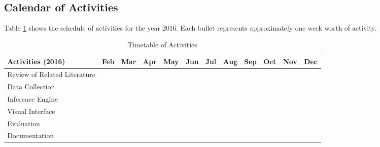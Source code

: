\begin{landscape}
\section{Calendar of Activities}

Table \ref{tab:timetableactivities} shows the schedule of activities for the year 2016.  
Each bullet represents approximately one week worth of activity.

%
%
\newcommand{\weekone}{\textbullet}
\newcommand{\weektwo}{\textbullet \textbullet}
\newcommand{\weekthree}{\textbullet \textbullet \textbullet}
\newcommand{\weekfour}{\textbullet \textbullet \textbullet \textbullet}

%
%
\begin{comment}
   \newcommand{\weekone}{$\star$}
   \newcommand{\weektwo}{$\star \star$}
   \newcommand{\weekthree}{$\star \star \star$}
   \newcommand{\weekfour}{$\star \star \star \star$ }
\end{comment}

\begin{table}[ht]   %
\centering
\caption{Timetable of Activities} \vspace{0.25em}
\begin{tabular}{|p{2in}|c|c|c|c|c|c|c|c|c|c|c|} \hline
\centering Activities (2016) & Feb  & Mar  & Apr  & May  & Jun  & Jul  & Aug  & Sep  & Oct  & Nov  &Dec\\ \hline
Review of Related Literature &  & ~~\weekthree  & \weekfour  & \weekfour  & \weekfour  &  &  &  &  &  &  \\ \hline
Data Collection &  &  & ~~~\weektwo  & \weekfour  & \weekfour  & \weekfour  & \weektwo~~~  &  &  &  &  \\ \hline
Inference Engine &  &  &  &~~~\weektwo  & \weekfour  & \weekfour  & \weekfour  & \weekfour  &  &  & \\ \hline
Visual Interface &  &  &  &  & ~~~\weektwo  & \weekfour  &  \weekfour  &  \weekfour  &  \weekfour  &  &  \\ \hline
Evaluation &  &  &  &  &  &  & ~~~\weektwo  & \weekfour  & \weekfour  &  &  \\ \hline
Documentation & ~~\weekthree  & \weekfour  & \weekfour  & \weekfour  & \weekfour  & \weekfour  & \weekfour  & \weekfour  & \weekfour  & \weekfour  & \weektwo~~~  \\ \hline
\end{tabular}
\label{tab:timetableactivities}
\end{table}

\end{landscape}